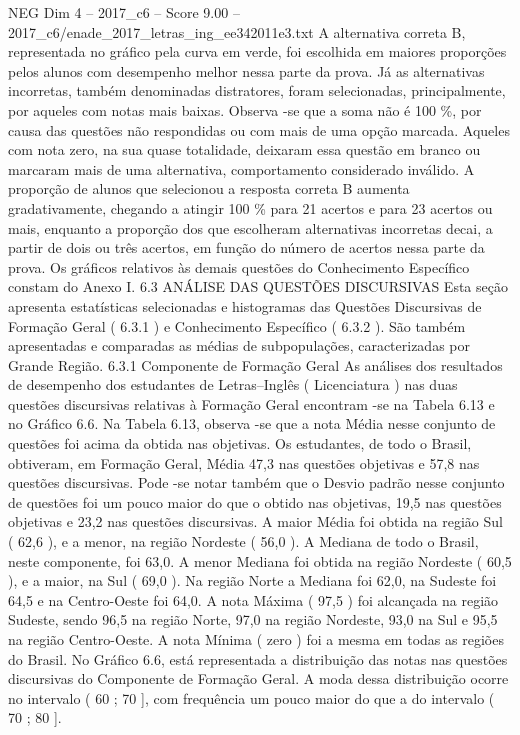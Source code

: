 \begin{textsample}{NEG Dim 4 – 2017\_c6 – Score 9.00 – 2017\_c6/enade\_2017\_letras\_ing\_ee342011e3.txt}
A alternativa correta B, representada no gráfico pela curva em verde, foi escolhida em maiores proporções pelos alunos com desempenho melhor nessa parte da prova.
Já as alternativas incorretas, também denominadas distratores, foram selecionadas, principalmente, por aqueles com notas mais baixas.
Observa -se que a soma não é 100 \%, por causa das questões não respondidas ou com mais de uma opção marcada.
Aqueles com nota zero, na sua quase totalidade, deixaram essa questão em branco ou marcaram mais de uma alternativa, comportamento considerado inválido.
A proporção de alunos que selecionou a resposta correta B aumenta gradativamente, chegando a atingir 100 \% para 21 acertos e para 23 acertos ou mais, enquanto a proporção dos que escolheram alternativas incorretas decai, a partir de dois ou três acertos, em função do número de acertos nessa parte da prova.
Os gráficos relativos às demais questões do Conhecimento Específico constam do Anexo I. 6.3 ANÁLISE DAS QUESTÕES DISCURSIVAS Esta seção apresenta estatísticas selecionadas e histogramas das Questões Discursivas de Formação Geral ( 6.3.1 ) e Conhecimento Específico ( 6.3.2 ).
São também apresentadas e comparadas as médias de subpopulações, caracterizadas por Grande Região. 6.3.1 Componente de Formação Geral As análises dos resultados de desempenho dos estudantes de Letras–Inglês ( Licenciatura ) nas duas questões discursivas relativas à Formação Geral encontram -se na Tabela 6.13 e no Gráfico 6.6.
Na Tabela 6.13, observa -se que a nota Média nesse conjunto de questões foi acima da obtida nas objetivas.
Os estudantes, de todo o Brasil, obtiveram, em Formação Geral, Média 47,3 nas questões objetivas e 57,8 nas questões discursivas.
Pode -se notar também que o Desvio padrão nesse conjunto de questões foi um pouco maior do que o obtido nas objetivas, 19,5 nas questões objetivas e 23,2 nas questões discursivas.
A maior Média foi obtida na região Sul ( 62,6 ), e a menor, na região Nordeste ( 56,0 ).
A Mediana de todo o Brasil, neste componente, foi 63,0.
A menor Mediana foi obtida na região Nordeste ( 60,5 ), e a maior, na Sul ( 69,0 ).
Na região Norte a Mediana foi 62,0, na Sudeste foi 64,5 e na Centro-Oeste foi 64,0.
A nota Máxima ( 97,5 ) foi alcançada na região Sudeste, sendo 96,5 na região Norte, 97,0 na região Nordeste, 93,0 na Sul e 95,5 na região Centro-Oeste.
A nota Mínima ( zero ) foi a mesma em todas as regiões do Brasil.
No Gráfico 6.6, está representada a distribuição das notas nas questões discursivas do Componente de Formação Geral.
A moda dessa distribuição ocorre no intervalo ( 60 ; 70 ], com frequência um pouco maior do que a do intervalo ( 70 ; 80 ].

\end{textsample}
